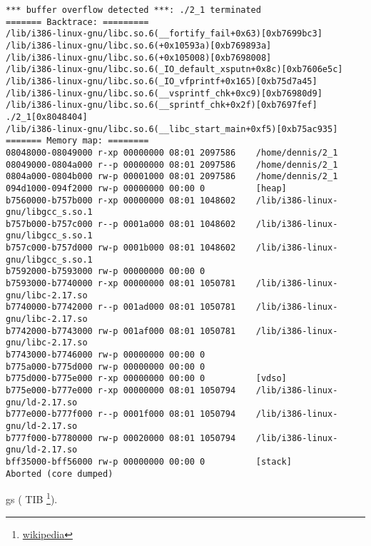 \begin{lstlisting}
*** buffer overflow detected ***: ./2_1 terminated
======= Backtrace: =========
/lib/i386-linux-gnu/libc.so.6(__fortify_fail+0x63)[0xb7699bc3]
/lib/i386-linux-gnu/libc.so.6(+0x10593a)[0xb769893a]
/lib/i386-linux-gnu/libc.so.6(+0x105008)[0xb7698008]
/lib/i386-linux-gnu/libc.so.6(_IO_default_xsputn+0x8c)[0xb7606e5c]
/lib/i386-linux-gnu/libc.so.6(_IO_vfprintf+0x165)[0xb75d7a45]
/lib/i386-linux-gnu/libc.so.6(__vsprintf_chk+0xc9)[0xb76980d9]
/lib/i386-linux-gnu/libc.so.6(__sprintf_chk+0x2f)[0xb7697fef]
./2_1[0x8048404]
/lib/i386-linux-gnu/libc.so.6(__libc_start_main+0xf5)[0xb75ac935]
======= Memory map: ========
08048000-08049000 r-xp 00000000 08:01 2097586    /home/dennis/2_1
08049000-0804a000 r--p 00000000 08:01 2097586    /home/dennis/2_1
0804a000-0804b000 rw-p 00001000 08:01 2097586    /home/dennis/2_1
094d1000-094f2000 rw-p 00000000 00:00 0          [heap]
b7560000-b757b000 r-xp 00000000 08:01 1048602    /lib/i386-linux-gnu/libgcc_s.so.1
b757b000-b757c000 r--p 0001a000 08:01 1048602    /lib/i386-linux-gnu/libgcc_s.so.1
b757c000-b757d000 rw-p 0001b000 08:01 1048602    /lib/i386-linux-gnu/libgcc_s.so.1
b7592000-b7593000 rw-p 00000000 00:00 0
b7593000-b7740000 r-xp 00000000 08:01 1050781    /lib/i386-linux-gnu/libc-2.17.so
b7740000-b7742000 r--p 001ad000 08:01 1050781    /lib/i386-linux-gnu/libc-2.17.so
b7742000-b7743000 rw-p 001af000 08:01 1050781    /lib/i386-linux-gnu/libc-2.17.so
b7743000-b7746000 rw-p 00000000 00:00 0
b775a000-b775d000 rw-p 00000000 00:00 0
b775d000-b775e000 r-xp 00000000 00:00 0          [vdso]
b775e000-b777e000 r-xp 00000000 08:01 1050794    /lib/i386-linux-gnu/ld-2.17.so
b777e000-b777f000 r--p 0001f000 08:01 1050794    /lib/i386-linux-gnu/ld-2.17.so
b777f000-b7780000 rw-p 00020000 08:01 1050794    /lib/i386-linux-gnu/ld-2.17.so
bff35000-bff56000 rw-p 00000000 00:00 0          [stack]
Aborted (core dumped)
\end{lstlisting}

gs\EMDASH{}
(
\ac{TIB} \footnote{\href{http://go.yurichev.com/17104}{wikipedia}}). 

